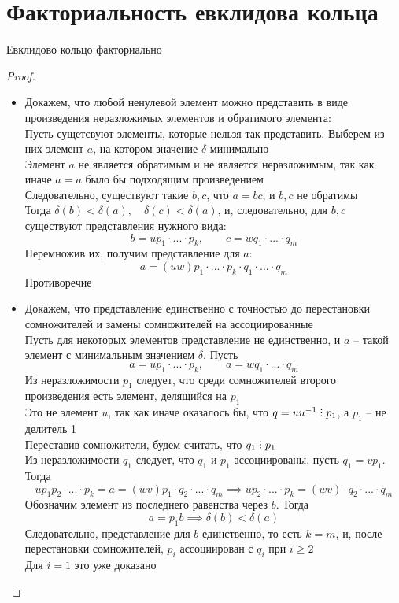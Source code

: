 \section{Факториальность евклидова кольца}

\begin{theorem}
	Евклидово кольцо факториально
\end{theorem}

\begin{proof}
	\hfill
	\begin{itemize}
		\item Докажем, что любой ненулевой элемент можно представить в виде произведения неразложимых элементов и обратимого элемента: \\
		Пусть сущетсвуют элементы, которые нельзя так представить. Выберем из них элемент $a$, на котором значение $\delta$ минимально \\
		Элемент $a$ не является обратимым и не является неразложимым, так как иначе $a = a$ было бы подходящим произведением \\
		Следовательно, существуют такие $b, c$, что $a = bc$, и $b, c$ не обратимы \\
		Тогда $\delta(b) < \delta(a), \quad \delta(c) < \delta(a)$, и, следовательно, для $b, c$ существуют представления нужного вида:
		$$ b = up_1 \cdot ... \cdot p_k, \qquad c = wq_1 \cdot ... \cdot q_m $$
		Перемножив их, получим представление для $a$:
		$$ a = (uw)p_1 \cdot ... \cdot p_k \cdot q_1 \cdot ... \cdot q_m $$
		Противоречие
		\item Докажем, что представление единственно с точностью до перестановки сомножителей и замены сомножителей на ассоциированные \\
		Пусть для некоторых элементов представление не единственно, и $a$ -- такой элемент с минимальным значением $\delta$. Пусть
		$$ a = up_1 \cdot ... \cdot p_k, \qquad a = wq_1 \cdot ... \cdot q_m $$
		Из неразложимости $p_1$ следует, что среди сомножителей второго произведения есть элемент, делящийся на $p_1$ \\
		Это не элемент $u$, так как иначе оказалось бы, что $q = uu^{-1} \divby p_1$, а $p_1$ -- не делитель 1 \\
		Переставив сомножители, будем считать, что $q_1 \divby p_1$ \\
		Из неразложимости $q_1$ следует, что $q_1$ и $p_1$ ассоциированы, пусть $q_1 = vp_1$. Тогда
		$$ up_1p_2 \cdot ... \cdot p_k = a = (wv)p_1 \cdot q_2 \cdot ... \cdot q_m \implies up_2 \cdot ... \cdot p_k = (wv) \cdot q_2 \cdot ... \cdot q_m $$
		Обозначим элемент из последнего равенства через $b$. Тогда
		$$ a = p_1b \implies \delta(b) < \delta(a) $$
		Следовательно, представление для $b$ единственно, то есть $k = m$, и, после перестановки сомножителей, $p_i$ ассоциирован с $q_i$ при $i \ge 2$ \\
		Для $i = 1$ это уже доказано
	\end{itemize}
\end{proof}

